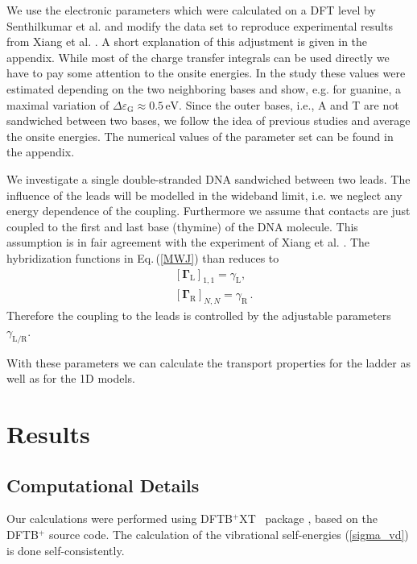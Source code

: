 \documentclass[reprint,superscriptaddress,nofootinbib,amsmath,amssymb,prb,floatfix]{revtex4-1}
\begin{document}
We use the electronic parameters which were calculated on a DFT level by Senthilkumar et
al.\cite{senthilkumar_absolute_2005} and modify the data set to reproduce experimental results from
Xiang et al. \cite{xiang_intermediate_2015}.  A short explanation of this adjustment is given in the
appendix.  While most of the charge transfer integrals can be used directly we have to pay some
attention to the onsite energies. In the study these values were estimated depending on the two
neighboring bases and show, e.g.  for guanine, a maximal variation of
$\Delta \varepsilon_\text{G} \approx 0.5\, \text{eV}$. Since the outer bases, i.e., A and T are not
sandwiched between two bases, we follow the idea of previous studies\cite{zilly_conductance_2010,
  kim_intermediate_2016} and average the onsite energies.  The numerical values of the parameter set
can be found in the appendix.

We investigate a single double-stranded DNA sandwiched between two leads.  The influence of the
leads will be modelled in the wideband limit, i.e. we neglect any energy dependence of the coupling.
Furthermore we assume that contacts are just coupled to the first and last base (thymine) of the DNA
molecule.  This assumption is in fair agreement with the experiment of Xiang et
al. \cite{xiang_intermediate_2015}.  The hybridization functions in Eq.\,(\ref{MWJ}) than reduces to
\begin{align}
 &\left[\boldsymbol{\Gamma}_\text{L}\right]_{1,1} = \gamma_\text{L}, \\
 &\left[\boldsymbol{\Gamma}_\text{R}\right]_{N,N} = \gamma_\text{R}\,.
\end{align}
Therefore the coupling to the leads is controlled by the adjustable parameters $\gamma_\text{L/R}$.

With these parameters we can calculate the transport properties for the ladder as well as for the 1D
models.

\section{Results}
\label{sec_results}

\subsection{Computational Details}
\label{subsec_comp}

Our calculations were performed using {\textsc{DFTB$^{\text{+}}$XT\ }} package \cite{DFTBXT}, based
on the {\textsc{DFTB$^{\text{+}}$}} \cite{Aradi07jpca,Pecchia08njp} source code. The calculation of
the vibrational self-energies (\ref{sigma_vd}) is done self-consistently.
\end{document}
